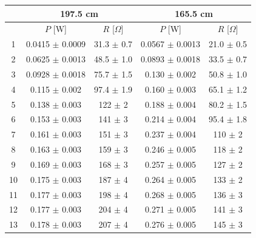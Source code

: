 \documentclass{article}
\begin{document}
{\begin{table}[H]\centering
    \begin{tabular}{ccc||cc}
        \toprule
           & \multicolumn{2}{c||}{197.5 cm} & \multicolumn{2}{c}{165.5 cm}                                                       \\
        \midrule
           & $P$ [W]                        & $R$ [$\Omega$]               & $P$ [W]              & $R$ [$\Omega$]               \\
        \midrule
        1  & 0.0415  $\pm$ 0.0009           & 31.3               $\pm$ 0.7 & 0.0567  $\pm$ 0.0013 & 21.0               $\pm$ 0.5 \\
        2  & 0.0625  $\pm$ 0.0013           & 48.5               $\pm$ 1.0 & 0.0893  $\pm$ 0.0018 & 33.5               $\pm$ 0.7 \\
        3  & 0.0928  $\pm$ 0.0018           & 75.7               $\pm$ 1.5 & 0.130   $\pm$ 0.002  & 50.8               $\pm$ 1.0 \\
        4  & 0.115   $\pm$ 0.002            & 97.4               $\pm$ 1.9 & 0.160   $\pm$ 0.003  & 65.1               $\pm$ 1.2 \\
        5  & 0.138   $\pm$ 0.003            & 122                $\pm$ 2   & 0.188   $\pm$ 0.004  & 80.2               $\pm$ 1.5 \\
        6  & 0.153   $\pm$ 0.003            & 141                $\pm$ 3   & 0.214   $\pm$ 0.004  & 95.4               $\pm$ 1.8 \\
        7  & 0.161   $\pm$ 0.003            & 151                $\pm$ 3   & 0.237   $\pm$ 0.004  & 110                $\pm$ 2   \\
        8  & 0.163   $\pm$ 0.003            & 159                $\pm$ 3   & 0.246   $\pm$ 0.005  & 118                $\pm$ 2   \\
        9  & 0.169   $\pm$ 0.003            & 168                $\pm$ 3   & 0.257   $\pm$ 0.005  & 127                $\pm$ 2   \\
        10 & 0.175   $\pm$ 0.003            & 187                $\pm$ 4   & 0.264   $\pm$ 0.005  & 133                $\pm$ 2   \\
        11 & 0.177   $\pm$ 0.003            & 198                $\pm$ 4   & 0.268   $\pm$ 0.005  & 136                $\pm$ 3   \\
        12 & 0.177   $\pm$ 0.003            & 204                $\pm$ 4   & 0.271   $\pm$ 0.005  & 141                $\pm$ 3   \\
        13 & 0.178   $\pm$ 0.003            & 207                $\pm$ 4   & 0.276   $\pm$ 0.005  & 145                $\pm$ 3   \\

\end{tabular}
\end{table}}
\end{document}
